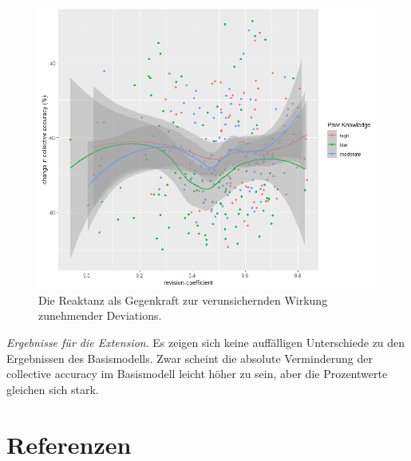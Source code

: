 \documentclass[
  man,mask,floatsintext]{apa6}
\begin{document}
\begin{figure}
\centering
\includegraphics{Abbildungen/rev_coeff.png}
\caption{\label{fig:my-figure7}Die Reaktanz als Gegenkraft zur verunsichernden Wirkung zunehmender Deviations.}
\end{figure}

\newpage

\emph{Ergebnisse für die Extension}. Es zeigen sich keine auffälligen Unterschiede zu den Ergebnissen des Basismodells. Zwar scheint die absolute Verminderung der collective accuracy im Basismodell leicht höher zu sein, aber die Prozentwerte gleichen sich stark.

\newpage

\section{Referenzen}\label{referenzen}
\end{document}
